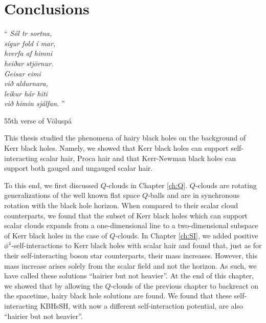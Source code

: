 \chapter{Conclusions}
\label{ch:conclusions}

\epigraph{``\emph{
Sól tr sortna, \\
sígur fold í mar, \\
hverfa af himni \\
heiðar stjörnur. \\
Geisar eimi \\
við aldurnara, \\
leikur hár hiti \\
við himin sjálfan. 
} 
''}{55th verse of Völuspá}


This thesis studied the phenomena of hairy black holes on the background of Kerr black holes.
Namely, we showed that Kerr black holes can support self-interacting scalar hair, Proca hair and that Kerr-Newman black holes can support both gauged and ungauged scalar hair.

To this end, we first discussed $Q$-clouds in Chapter \ref{ch:Q}.
$Q$-clouds are rotating generalizations of the well known flat space $Q$-balls and are in synchronous rotation with the black hole horizon.
When compared to their scalar cloud counterparts, we found that the subset of Kerr black holes which can support scalar clouds expands from a one-dimensional line to a two-dimensional subspace of Kerr black holes in the case of $Q$-clouds.
In Chapter \ref{ch:SI}, we added positive $\phi^4$-self-interactions to Kerr black holes with scalar hair and found that, just as for their self-interacting boson star counterparts, their mass increases.
However, this mass increase arises solely from the scalar field and not the horizon.
As such, we have called these solutions ``hairier but not heavier''.
At the end of this chapter, we showed that by allowing the $Q$-clouds of the previous chapter to backreact on the spacetime, hairy black hole solutions are found.
We found that these self-interacting KBHsSH, with now a different self-interaction potential, are also ``hairier but not heavier''.

\bigskip

